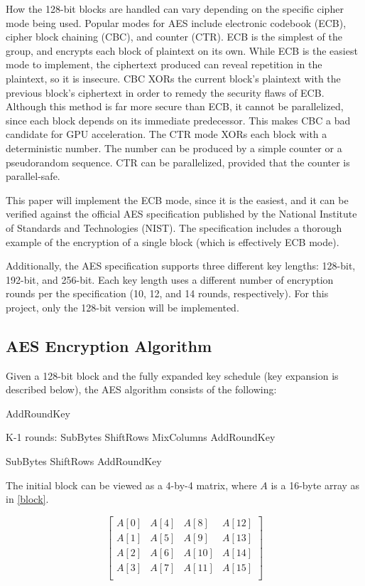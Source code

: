 \documentclass[a4paper,10pt,conference]{IEEEtran}
\begin{document}
How the 128-bit blocks are handled can vary depending on the specific cipher mode being used.  Popular modes for AES include electronic codebook (ECB), cipher block chaining (CBC), and counter (CTR)\cite{intel}.  ECB is the simplest of the group, and encrypts each block of plaintext on its own.  While ECB is the easiest mode to implement, the ciphertext produced can reveal repetition in the plaintext, so it is insecure.  CBC XORs the current block's plaintext with the previous block's ciphertext in order to remedy the security flaws of ECB.  Although this method is far more secure than ECB, it cannot be parallelized, since each block depends on its immediate predecessor.  This makes CBC a bad candidate for GPU acceleration.  The CTR mode XORs each block with a deterministic number.  The number can be produced by a simple counter or a pseudorandom sequence.  CTR can be parallelized, provided that the counter is parallel-safe.

This paper will implement the ECB mode, since it is the easiest, and it can be verified against the official AES specification published by the National Institute of Standards and Technologies (NIST).  The specification includes a thorough example of the encryption of a single block (which is effectively ECB mode).

Additionally, the AES specification supports three different key lengths: 128-bit, 192-bit, and 256-bit.  Each key length uses a different number of encryption rounds per the specification (10, 12, and 14 rounds, respectively).  For this project, only the 128-bit version will be implemented.

\subsection{AES Encryption Algorithm}

Given a 128-bit block and the fully expanded key schedule (key expansion is described below), the AES algorithm consists of the following\cite{nist}:

AddRoundKey

K-1 rounds:
    SubBytes
    ShiftRows
    MixColumns
    AddRoundKey

SubBytes
ShiftRows
AddRoundKey

The initial block can be viewed as a 4-by-4 matrix, where $A$ is a 16-byte array as in \ref{block}.

\begin{equation}
 \begin{bmatrix}
  A[0] & A[4] & A[8] & A[12] \\
  A[1] & A[5] & A[9] & A[13] \\
  A[2] & A[6] & A[10] & A[14] \\
  A[3] & A[7] & A[11] & A[15] \\
 \end{bmatrix}
\label{block}
\end{equation}
\end{document}
